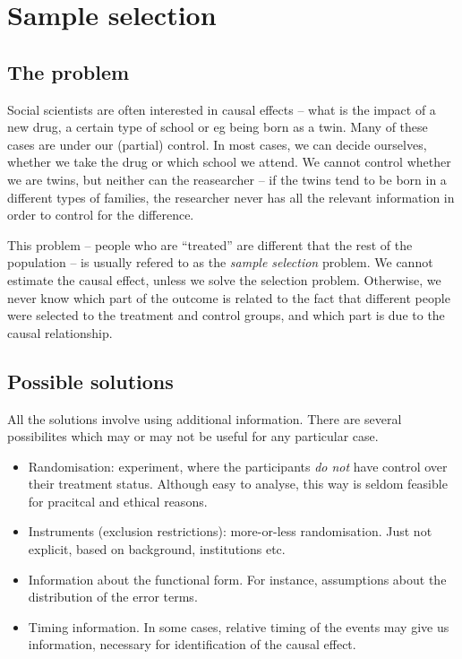 \section{Sample selection}


\subsection{The problem}

Social scientists are often interested in causal effects -- what is
the impact of a new drug, a certain type of school or eg being born as
a twin.  Many of these cases are under our (partial) control.  In most
cases, we can decide ourselves, whether we take the drug or which
school we attend.  We cannot control whether we are twins, but neither
can the reasearcher -- if the twins tend to be born in a different
types of families, the researcher never has all the relevant
information in order to control for the difference.

This problem -- people who are ``treated'' are different that the rest
of the population -- is usually refered to as the \emph{sample
  selection} problem.  We cannot estimate the causal effect, unless we
solve the selection problem.  Otherwise, we never know which part of
the outcome is related to the fact that different people were selected
to the treatment and control groups, and which part is due to the
causal relationship.


\subsection{Possible solutions}

All the solutions involve using additional information.  There are
several possibilites which may or may not be useful for any particular
case. 

\begin{itemize}
\item Randomisation: experiment, where the participants \emph{do not}
  have control over their treatment status.  Although easy to analyse,
  this way is seldom feasible for pracitcal and ethical reasons.
\item Instruments (exclusion restrictions): more-or-less
  randomisation.  Just not explicit, based on background, institutions
  etc.
\item Information about the functional form.  For instance,
  assumptions about the distribution of the error terms.
\item Timing information.  In some cases, relative timing of the
  events may give us information, necessary for identification of the
  causal effect.
\end{itemize}

